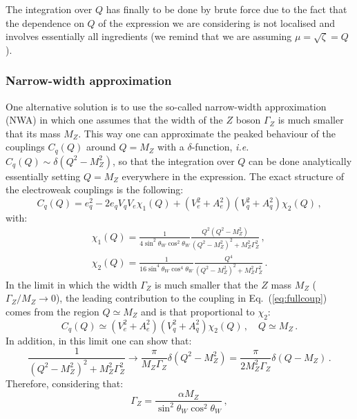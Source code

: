\documentclass[10pt,a4paper]{article}
\begin{document}
The integration over $Q$ has finally to be done by brute force due to
the fact that the dependence on $Q$ of the expression we are
considering is not localised and involves essentially all ingredients
(we remind that we are assuming $\mu=\sqrt{\zeta}=Q$).

\subsubsection{Narrow-width approximation}
One alternative
solution is to use the so-called narrow-width approximation (NWA) in
which one assumes that the width of the $Z$ boson $\Gamma_Z$ is much
smaller that its mass $M_Z$. This way one can approximate the peaked
behaviour of the couplings $C_q(Q)$ around $Q=M_Z$ with a
$\delta$-function, \textit{i.e.} $C_q(Q)\sim \delta(Q^2-M_Z^2)$, so
that the integration over $Q$ can be done analytically essentially
setting $Q=M_Z$ everywhere in the expression. The exact structure of
the electroweak couplings is the following:
\begin{equation}\label{eq:fullcoup}
C_q(Q) = e_q^2 - 2 e_q V_q V_e \chi_1(Q) + (V_e^2 + A_e^2)(V_q^2 + A_q^2)\chi_2(Q)\,,
\end{equation}
with:
\begin{equation}
\begin{array}{l}
\displaystyle \chi_1(Q) = \frac{1}{4 \sin^2\theta_W \cos^2\theta_W } \frac{Q^2 ( Q^2 -  M_Z^2 )}{ (Q^2 - M_Z^2)^2 + M_Z^2 \Gamma_Z^2} \,,\\
\displaystyle \chi_2(Q) = \frac{1}{16 \sin^4\theta_W\cos^4\theta_W} \frac{Q^4}{ (Q^2 - M_Z^2)^2 + M_Z^2 \Gamma_Z^2} \,.
\end{array}
\end{equation}
In the limit in which the width $\Gamma_Z$ is much smaller that the
$Z$ mass $M_Z$ ($\Gamma_Z/M_Z\rightarrow 0$), the leading contribution
to the coupling in Eq.~(\ref{eq:fullcoup}) comes from the region
$Q\simeq M_Z$ and is that proportional to $\chi_2$:
\begin{equation}\label{eq:partlead}
C_q(Q) \simeq (V_e^2 + A_e^2)(V_q^2 + A_q^2)\chi_2(Q)\,,\quad Q\simeq M_Z\,.
\end{equation}
In addition, in this limit one can show that:
\begin{equation}\label{eq:breitwigner}
\frac{1}{ (Q^2 - M_Z^2)^2 + M_Z^2 \Gamma_Z^2}\rightarrow
\frac{\pi}{M_Z\Gamma_Z}\delta(Q^2-M_Z^2) = \frac{\pi}{2M_Z^2\Gamma_Z}\delta(Q-M_Z)\,.
\end{equation}
Therefore, considering that:
\begin{equation}
\Gamma_Z = \frac{\alpha M_Z}{\sin^2\theta_W \cos^2\theta_W}\,,
\end{equation}
\end{document}
